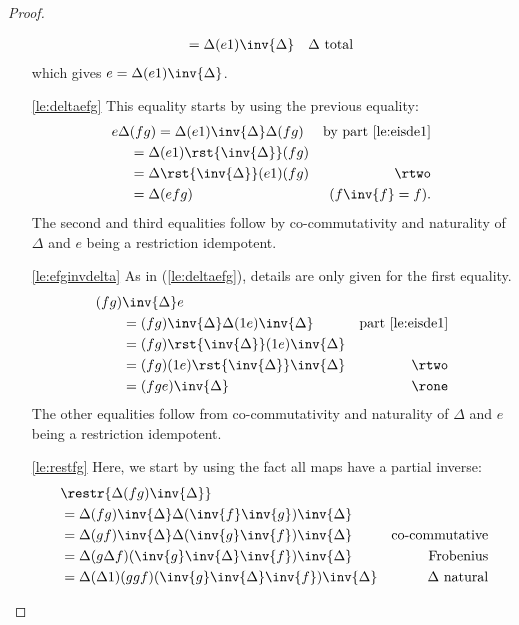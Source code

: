\begin{proof}
\begin{enumerate}[{(}i{)}]
\begin{align*}
        &=\Delta (e \* 1) \inv{\Delta} &\Delta\text{ total}\
      \end{align*}
      which gives $e = \Delta (e \* 1) \inv{\Delta}$.
    \item[\ref{le:deltaefg}]This equality starts by using the previous equality:
      \begin{align*}
        e\Delta &(f \* g) = \Delta (e\* 1) \inv{\Delta} \Delta(f \* g)
          &\text{by part \ref{le:eisde1}}\\
        &=\Delta(e  \* 1) \rst{\inv{\Delta}}(f\*g)&\\
        &=\Delta\rst{\inv{\Delta}}(e \*1)(f\*g)
          & \text{\rtwo}\\
        &=\Delta (e f \* g) &\text{ ($f\inv{f} = f$)}.
      \end{align*}
      The second and third equalities follow by co-commutativity and naturality of $\Delta$ and $e$
      being a restriction idempotent.
    \item[\ref{le:efginvdelta}] As in (\ref{le:deltaefg}), details are only given for the
      first equality.
      \begin{align*}
        (f \* g)&\inv{\Delta} e \\
        &= (f \* g) \inv{\Delta}\Delta (1\*e) \inv{\Delta}   &\text{part \ref{le:eisde1}}\\
        &=(f\*g)\rst{\inv{\Delta}}(1\*e) \inv{\Delta}&\\
        &=(f\*g)(1\*e) \rst{\inv{\Delta}}\inv{\Delta}&\rtwo\\
        &=(f\*g e)\inv{\Delta}&\rone
      \end{align*}
      The other equalities follow from co-commutativity and naturality of $\Delta$ and $e$ being
      a restriction idempotent.
    \item[\ref{le:restfg}]Here, we start by using the fact all maps have a partial inverse:
      \begin{align*}
        ~&\restr{\Delta (f \* g) \inv{\Delta} } \\
        &=\Delta (f \* g) \inv{\Delta} \Delta (\inv{f} \* \inv{g}) \inv{\Delta} \\
        &=\Delta (g \* f) \inv{\Delta} \Delta (\inv{g} \* \inv{f}) \inv{\Delta}& \text{co-commutative} \\
        &=\Delta(g\Delta \*f)(\inv{g}\*\inv{\Delta}\inv{f})\inv{\Delta}&\text{Frobenius}\\
        &=\Delta (\Delta\*1)(g \* g \* f)(\inv{g}\*\inv{\Delta}\inv{f})\inv{\Delta}&\Delta \text{ natural}\\

\end{align*}
\end{enumerate}
\end{proof}
